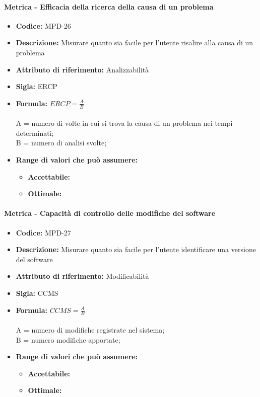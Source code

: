                \paragraph{Metrica - Efficacia della ricerca della causa di un problema} 
            \begin{itemize}
            \item  \textbf{Codice:} MPD-26
            \item  \textbf{Descrizione:} Misurare quanto sia facile per l'utente risalire alla causa di un problema
           \item   \textbf{Attributo di riferimento:} Analizzabilità
           \item   \textbf{Sigla:} ERCP
           \item   \textbf{Formula:} \begin{math}ERCP = \frac{A}{B}\end{math}\\ \\
            A = numero di volte in cui si trova la causa di un problema nei tempi determinati;\\
            B = numero di analisi svolte;
            \item \textbf{Range di valori che può assumere:}
        \begin{itemize}
            \item \textbf{Accettabile:} 
            \item \textbf{Ottimale:} 
        \end{itemize}
       \end{itemize}
       
                       \paragraph{Metrica - Capacità di controllo delle modifiche del software} 
            \begin{itemize}
            \item  \textbf{Codice:} MPD-27
            \item  \textbf{Descrizione:} Misurare quanto sia facile per l'utente identificare una versione del software
           \item   \textbf{Attributo di riferimento:} Modificabilità
           \item   \textbf{Sigla:} CCMS
           \item   \textbf{Formula:} \begin{math}CCMS = \frac{A}{B}\end{math}\\ \\
            A = numero di modifiche registrate nel sistema;\\
            B = numero modifiche apportate;
            \item \textbf{Range di valori che può assumere:}
        \begin{itemize}
            \item \textbf{Accettabile:} 
            \item \textbf{Ottimale:} 
        \end{itemize}
       \end{itemize}

